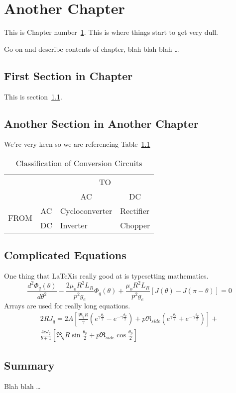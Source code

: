 \chapter{Another Chapter}\label{chap:another}

This is Chapter number~\ref{chap:another}. This is where
things start to get very dull.

Go on and describe contents of chapter, blah blah blah \ldots


\section{First Section in Chapter}\label{another:sec}

This is section~\ref{another:sec}.

\section{Another Section in Another Chapter}

We're very keen so we are referencing Table~\ref{conversion}

\begin{table}[!h]
\centering
\begin{tabular}{l|l|l|l|}
\multicolumn{1}{l}{}&\multicolumn{1}{l}{}&\multicolumn{2}{c}{TO}\\ 
\cline{3-4}
\multicolumn{1}{l}{}&\multicolumn{1}{c|}{}&\multicolumn{1}{c|}{AC}&\multicolumn{1}{c|}{DC}\\ 
\cline{2-4}
\multirow{2}{*}{FROM}&\multicolumn{1}{c|}{AC}&Cycloconverter&Rectifier\\ 
&\multicolumn{1}{c|}{DC}&Inverter&Chopper\\ 
\cline{2-4}
\end{tabular}
\caption[Caption for List of Tables]{Classification of Conversion Circuits}
\label{conversion}
\end{table}

\section{Complicated Equations}

One thing that \LaTeX is really good at is typesetting mathematics.
\begin{equation}
\frac{d^2 \Phi_q(\theta)}{d\theta^2}-\frac{2\mu_o R^2 L_R}{p^2 g_e}\Phi_q(\theta)
+\frac{\mu_o R^2 L_R}{p^2 g_e} \left[J(\theta)-J(\pi-\theta)\right]=0
\label{aeqn:mm16}
\end{equation}
Arrays are used for really long equations.
\begin{eqnarray}
2RJ_q=2A\left[\frac{\Re_qR}{\gamma}(e^{\gamma\frac{\theta_p}{2}}-e^{-\gamma\frac{\theta_p}{2}})
+p\Re_{side}(e^{\gamma\frac{\theta_p}{2}}+e^{-\gamma\frac{\theta_p}{2}})\right]+
\nonumber\\
\frac{4cJ_q}{b+1}\left[\Re_qR\sin\frac{\theta_p}{2}+p\Re_{side}\cos\frac{\theta_p}{2}\right]
\end{eqnarray}


\section{Summary}

Blah blah \ldots
